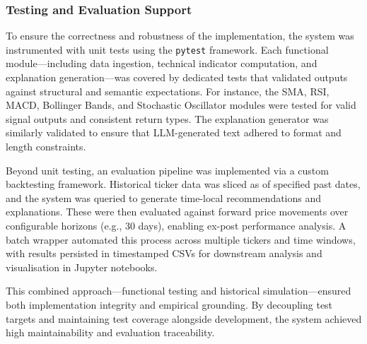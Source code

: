 \subsubsection{Testing and Evaluation Support}

To ensure the correctness and robustness of the implementation, the system was instrumented with unit tests using the \texttt{pytest} framework. Each functional module—including data ingestion, technical indicator computation, and explanation generation—was covered by dedicated tests that validated outputs against structural and semantic expectations. For instance, the SMA, RSI, MACD, Bollinger Bands, and Stochastic Oscillator modules were tested for valid signal outputs and consistent return types. The explanation generator was similarly validated to ensure that LLM-generated text adhered to format and length constraints.

Beyond unit testing, an evaluation pipeline was implemented via a custom backtesting framework. Historical ticker data was sliced as of specified past dates, and the system was queried to generate time-local recommendations and explanations. These were then evaluated against forward price movements over configurable horizons (e.g., 30 days), enabling ex-post performance analysis. A batch wrapper automated this process across multiple tickers and time windows, with results persisted in timestamped CSVs for downstream analysis and visualisation in Jupyter notebooks.

This combined approach—functional testing and historical simulation—ensured both implementation integrity and empirical grounding. By decoupling test targets and maintaining test coverage alongside development, the system achieved high maintainability and evaluation traceability.
